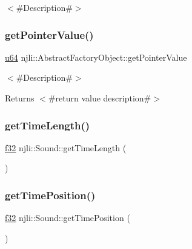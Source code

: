 $<$\#\+Description\#$>$ \mbox{\label{classnjli_1_1_sound_a4ffddf141a426a5a07d0ac19f1913811}} 
\subsubsection{\texorpdfstring{get\+Pointer\+Value()}{getPointerValue()}}
{\footnotesize\ttfamily \mbox{\hyperlink{_util_8h_ad758b7a5c3f18ed79d2fcd23d9f16357}{u64}} njli\+::\+Abstract\+Factory\+Object\+::get\+Pointer\+Value}

$<$\#\+Description\#$>$

\begin{DoxyReturn}{Returns}
$<$\#return value description\#$>$ 
\end{DoxyReturn}
\mbox{\label{classnjli_1_1_sound_a310e49f228af60ce97e14fc1b6a448a0}} 
\subsubsection{\texorpdfstring{get\+Time\+Length()}{getTimeLength()}}
{\footnotesize\ttfamily \mbox{\hyperlink{_util_8h_a5f6906312a689f27d70e9d086649d3fd}{f32}} njli\+::\+Sound\+::get\+Time\+Length (\begin{DoxyParamCaption}{ }\end{DoxyParamCaption})}

\mbox{\label{classnjli_1_1_sound_ab901d2259a11d7fcfb81703bdd123f67}} 
\subsubsection{\texorpdfstring{get\+Time\+Position()}{getTimePosition()}}
{\footnotesize\ttfamily \mbox{\hyperlink{_util_8h_a5f6906312a689f27d70e9d086649d3fd}{f32}} njli\+::\+Sound\+::get\+Time\+Position (\begin{DoxyParamCaption}{ }\end{DoxyParamCaption})}

